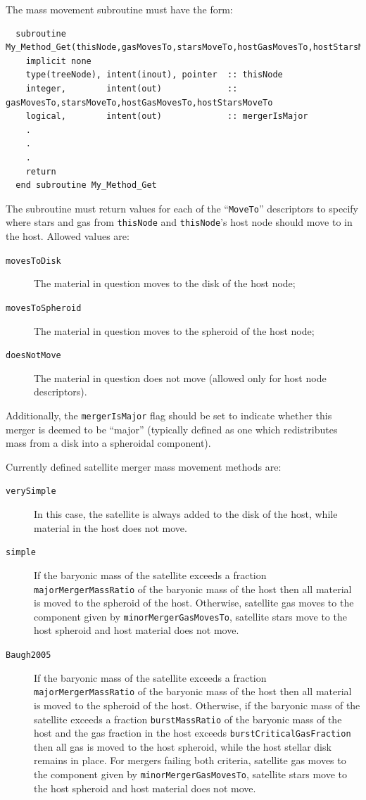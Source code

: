 The mass movement subroutine must have the form:
\begin{verbatim}
  subroutine My_Method_Get(thisNode,gasMovesTo,starsMoveTo,hostGasMovesTo,hostStarsMoveTo,mergerIsMajor)
    implicit none
    type(treeNode), intent(inout), pointer  :: thisNode
    integer,        intent(out)             :: gasMovesTo,starsMoveTo,hostGasMovesTo,hostStarsMoveTo
    logical,        intent(out)             :: mergerIsMajor
    .
    .
    .
    return
  end subroutine My_Method_Get
\end{verbatim}
The subroutine must return values for each of the ``{\tt MoveTo}'' descriptors to specify where stars and gas from {\tt thisNode} and {\tt thisNode}'s host node should move to in the host. Allowed values are:
\begin{description}
 \item [{\tt movesToDisk}] The material in question moves to the disk of the host node;
 \item [{\tt movesToSpheroid}] The material in question moves to the spheroid of the host node;
 \item [{\tt doesNotMove}] The material in question does not move (allowed only for host node descriptors).
\end{description}
Additionally, the {\tt mergerIsMajor} flag should be set to indicate whether this merger is deemed to be ``major'' (typically defined as one which redistributes mass from a disk into a spheroidal component).

Currently defined satellite merger mass movement methods are:
\begin{description}
 \item [{\tt verySimple}] In this case, the satellite is always added to the disk of the host, while material in the host does not move.
 \item [{\tt simple}] If the baryonic mass of the satellite exceeds a fraction {\tt majorMergerMassRatio} of the baryonic mass of the host then all material is moved to the spheroid of the host. Otherwise, satellite gas moves to the component given by {\tt minorMergerGasMovesTo}, satellite stars move to the host spheroid and host material does not move.
 \item [{\tt Baugh2005}] If the baryonic mass of the satellite exceeds a fraction {\tt majorMergerMassRatio} of the baryonic mass of the host then all material is moved to the spheroid of the host. Otherwise, if the baryonic mass of the satellite exceeds a fraction {\tt burstMassRatio} of the baryonic mass of the host and the gas fraction in the host exceeds {\tt burstCriticalGasFraction} then all gas is moved to the host spheroid, while the host stellar disk remains in place. For mergers failing both criteria, satellite gas moves to the component given by {\tt minorMergerGasMovesTo}, satellite stars move to the host spheroid and host material does not move. 
\end{description}

